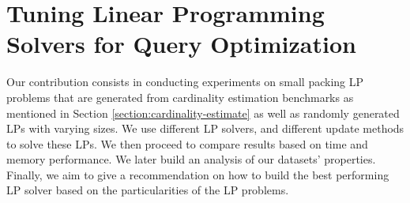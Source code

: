 \chapter{Tuning Linear Programming Solvers for Query Optimization}\label{chapter:linearprogramming}

Our contribution consists in conducting experiments on small packing LP problems that are generated from
cardinality estimation benchmarks as mentioned in Section \ref{section:cardinality-estimate} as well as randomly generated LPs with varying sizes. We use different LP solvers, and different update methods to solve these LPs. We then proceed to compare results based on time and memory performance. We later build an analysis of our datasets' properties. Finally, we aim to give a recommendation on how to build the best performing LP solver based on the particularities of the LP problems.


